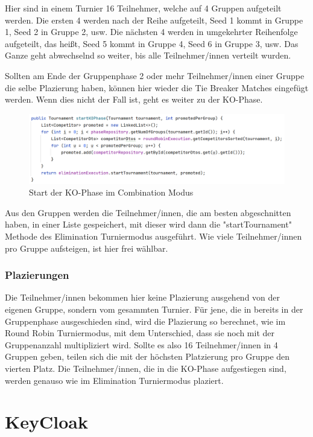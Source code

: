 Hier sind in einem Turnier 16 Teilnehmer, welche auf 4 Gruppen aufgeteilt werden. Die ersten 4 werden nach der Reihe aufgeteilt, Seed 1 kommt in Gruppe 1, Seed 2 in Gruppe 2, usw. 
Die nächsten 4 werden in umgekehrter Reihenfolge aufgeteilt, das heißt, Seed 5 kommt in Gruppe 4, Seed 6 in Gruppe 3, usw. Das Ganze geht abwechselnd so weiter, bis alle Teilnehmer/innen verteilt wurden.

Sollten am Ende der Gruppenphase 2 oder mehr Teilnehmer/innen einer Gruppe die selbe Plazierung haben, können hier wieder die Tie Breaker Matches eingefügt werden.
Wenn dies nicht der Fall ist, geht es weiter zu der KO-Phase.

\begin{figure}[H]
    \includegraphics[scale=0.45]{pics/backend/combination/combination_startKOPhase.png}
    \caption{Start der KO-Phase im Combination Modus}
\end{figure}

Aus den Gruppen werden die Teilnehmer/innen, die am besten abgeschnitten haben, in einer Liste gespeichert, mit dieser wird dann die "startTournament" Methode des Elimination Turniermodus ausgeführt. 
Wie viele Teilnehmer/innen pro Gruppe aufsteigen, ist hier frei wählbar.

\subsubsection{Plazierungen}

Die Teilnehmer/innen bekommen hier keine Plazierung ausgehend von der eigenen Gruppe, sondern vom gesammten Turnier. Für jene, die in bereits in der Gruppenphase ausgeschieden sind, wird die Plazierung so berechnet, 
wie im Round Robin Turniermodus, mit dem Unterschied, dass sie noch mit der Gruppenanzahl multipliziert wird. Sollte es also 16 Teilnehmer/innen in 4 Gruppen geben, teilen sich die mit der höchsten Platzierung pro Gruppe den vierten Platz. 
Die Teilnehmer/innen, die in die KO-Phase aufgestiegen sind, werden genauso wie im Elimination Turniermodus plaziert.

\section{KeyCloak}

